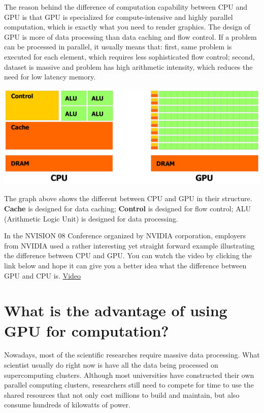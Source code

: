 \documentclass[letterpaper,10pt,english]{sphinxmanual}
\begin{document}
The reason behind the difference of computation capability between CPU and GPU is that GPU is specialized for compute-intensive and highly parallel computation, which is exactly what you need to render graphics. The design of GPU is more of data processing than data caching and flow control. If a problem can be processed in parallel, it usually means that: first, same problem is executed for each element, which requires less sophisticated flow control; second, dataset is massive and problem has high arithmetic intensity, which reduces the need for low latency memory.

{\hfill\includegraphics{CPUGPU.png}\hfill}

The graph above shows the different between CPU and GPU in their structure. \textbf{Cache} is designed for data caching; \textbf{Control} is designed for flow control; ALU (Arithmetic Logic Unit) is designed for data processing.

In the NVISION 08 Conference organized by NVIDIA corporation, employers from NVIDIA used a rather interesting yet straight forward example illustrating the difference between CPU and GPU. You can watch the video by clicking the link below and hope it can give you a better idea what the difference between GPU and CPU is.
\href{http://www.NVIDIA.com/object/nvision08\_gpu\_v\_cpu.html}{Video}


\section{What is the advantage of using GPU for computation?}
\label{Introduction/Introduction:what-is-the-advantage-of-using-gpu-for-computation}
Nowadays, most of the scientific researches require massive data processing. What scientist usually do right now is have all the data being processed on supercomputing clusters. Although most universities have constructed their own parallel computing clusters, researchers still need to compete for time to use the shared resources that not only cost millions to build and maintain, but also consume hundreds of kilowatts of power.
\end{document}
